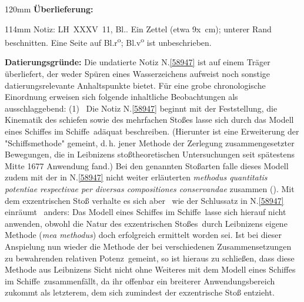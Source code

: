 %
\frenchspacing%
\begin{ledgroupsized}[r]{120mm}%
\footnotesize%
\pstart%
\noindent\textbf{Überlieferung:}
\pend%
\end{ledgroupsized}
\begin{ledgroupsized}[r]{114mm}%
\footnotesize%
\pstart%
\parindent -6mm%
%
Notiz:
LH~XXXV~11, Bl..
Ein Zettel (etwa 9\:x~cm);
unterer Rand beschnitten.
Eine Seite auf Bl.\:r\textsuperscript{o}; Bl.\:v\textsuperscript{o} ist unbeschrieben.
\pend%
\end{ledgroupsized}%
\vspace{5mm}%
\begin{ledgroup}%
\footnotesize%
\pstart%
\noindent%
\textbf{Datierungsgründe:}
Die undatierte Notiz N.\;\ref{58947} ist auf einem Träger überliefert, der weder Spüren eines Wasserzeichens aufweist noch sonstige datierungsrelevante Anhaltspunkte bietet.
Für eine grobe chronologische Einordnung erweisen sich folgende inhaltliche Beobachtungen als ausschlaggebend:
\pend%
\pstart%
(1)~%
Die Notiz N.\;\ref{58947} beginnt mit der Feststellung, die Kinematik des schiefen sowie des mehrfachen Stoßes lasse sich durch das Modell eines \glqq Schiffes im Schiffe\grqq\ adäquat beschreiben.
(Hierunter ist eine Erweiterung der "Schiffsmethode" gemeint, d.\,h. jener Methode der Zerlegung zusammengesetzter Bewegungen, die in Leibnizens stoßtheoretischen Untersuchungen seit spätestens Mitte 1677 Anwendung fand.)
Bei den genannten Stoßarten falle dieses Modell %
zudem mit der in N.\;\ref{58947} nicht weiter erläuterten \textit{methodus quantitatis potentiae respectivae per diversas compositiones conservandae} zusammen ().
Mit dem exzentrischen Stoß verhalte es sich aber \textendash\ wie der Schlussatz in N.\;\ref{58947} einräumt \textendash\ anders:
Das Modell eines \glqq Schiffes im Schiffe\grqq\ lasse sich hierauf nicht anwenden, obwohl die \glqq Natur des exzentrischen Stoßes\grqq\ durch Leibnizens eigene Methode (\textit{mea methodus}) doch erfolgreich ermittelt worden sei. %
Ist bei dieser Anspielung nun wieder die \glqq Methode der bei verschiedenen Zusammensetzungen zu bewahrenden relativen Potenz\grqq\ gemeint, so ist hieraus zu schließen, dass diese Methode aus Leibnizens Sicht nicht ohne Weiteres mit dem \glqq Modell eines Schiffes im Schiffe\grqq\ zusammenfällt, da ihr offenbar ein breiterer Anwendungsbereich zukommt als letzterem, dem sich zumindest der exzentrische Stoß entzieht. 

\end{ledgroup}
